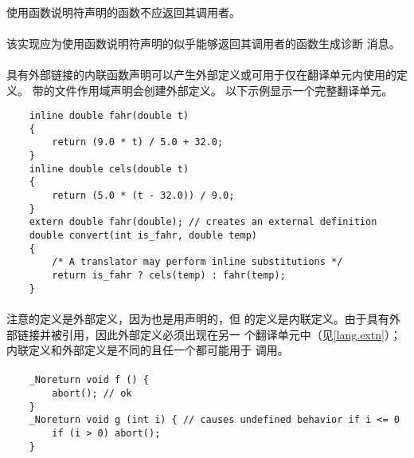 {\paragraph{}
使用函数说明符声明的函数不应返回其调用者。

\recprac
\paragraph{}
该实现应为使用函数说明符声明的似乎能够返回其调用者的函数生成诊断
消息。

\paragraph{}
\ex 具有外部链接的内联函数声明可以产生外部定义或可用于仅在翻译单元内使用的定义。
带的文件作用域声明会创建外部定义。 以下示例显示一个完整翻译单元。
\begin{lstlisting}
    inline double fahr(double t)
    {
        return (9.0 * t) / 5.0 + 32.0;
    }
    inline double cels(double t)
    {
        return (5.0 * (t - 32.0)) / 9.0;
    }
    extern double fahr(double); // creates an external definition
    double convert(int is_fahr, double temp)
    {
        /* A translator may perform inline substitutions */
        return is_fahr ? cels(temp) : fahr(temp);
    }
\end{lstlisting}

\paragraph{}
注意的定义是外部定义，因为也是用声明的，但
的定义是内联定义。由于具有外部链接并被引用，因此外部定义必须出现在另一
个翻译单元中（见\ref{lang.extn}）；内联定义和外部定义是不同的且任一个都可能用于
调用。

\paragraph{}
\ex
\begin{lstlisting}
    _Noreturn void f () {
        abort(); // ok
    }
    _Noreturn void g (int i) { // causes undefined behavior if i <= 0
        if (i > 0) abort();
    }
\end{lstlisting}


\syntax
\paragraph{}

}
